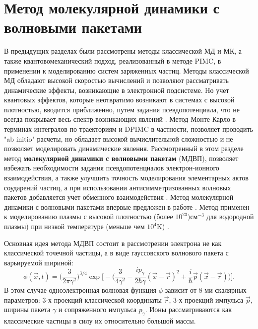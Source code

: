 \section{Метод молекулярной динамики с волновыми пакетами}

В предыдущих разделах были рассмотрены методы классической МД и МК, а также квантовомеханический подход, реализованный в методе PIMC, в применении к моделированию систем заряженных частиц.
Методы классической МД обладают высокой скоростью вычислений и позволяют рассматривать динамические эффекты, возникающие в электронной подсистеме.  Но учет квантовых эффектов, которые неотвратимо возникают в системах с высокой плотностью, вводится приближенно, путем задания псевдопотенциала, что не всегда покрывает весь спектр возникающих явлений \cite{kelbg1964theorie}. 
Метод Монте-Карло в терминах интегралов по траекториям и DPIMC в частности, позволяет проводить "ab initio" расчеты, но обладает высокой вычислительной сложностью и не позволяет моделировать динамические явления. 
Рассмотренный в этом разделе метод  \textbf{молекулярной динамики с волновыми пакетам} (МДВП), позволяет избежать необходимости задания псевдопотенциалов электрон-ионного взаимодействия, а также улучшить точность моделирования элементарных актов соударений частиц, а при использовании антисимметризованных волновых пакетов добавляется учет обменного взаимодействия \cite{morozov2012improvement}. Метод молекулярной динамики с волновыми пакетами впервые предложен в работе \cite{klakow1994semiclassical}. Метод применен к моделированию плазмы с высокой плотностью (более $10^{23}) \mathrm{см}^{-3}$ для водородной плазмы) при низкой температуре (меньше чем $10^4 \mathrm{K}$)  \cite{graziani2012large, knaup2003wave}.

Основная идея метода МДВП состоит в рассмотрении электрона не как классической точечной частицы, а в виде гауссовского волнового пакета с варьируемой шириной:
\begin{equation}
	\label{wpmd:eq-gauss-packet}
	\phi(\vec{x},t) = \Big(\frac{3}{2\pi\gamma^2}\Big)^{3/4} \exp \Big[ -\Big( \frac{3}{4\gamma^2} - \frac{ip_\gamma}{2\hbar\gamma}(\vec{x} - \vec{r})^2 + \frac{i}{\hbar}\vec{p}(\vec{x} - \vec{r})
	\Big) \Big].
\end{equation}
В этом случае одноэлектронная волновая функция  $\phi$ зависит от 8-ми скалярных параметров: 3-х проекций классической координаты $\vec{r}$, 3-х проекций импульса $\vec{p}$, ширины пакета $\gamma$ и сопряженного импульса $p_\gamma$. Ионы рассматриваются как классические частицы в силу их относительно большой массы.

